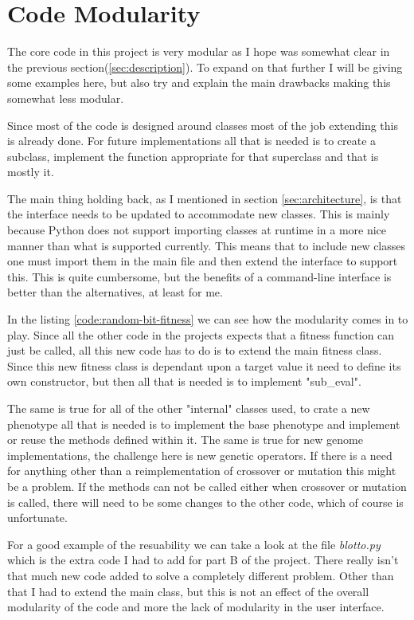 \section{Code Modularity}\label{sec:modularity}
The core code in this project is very modular as I hope was somewhat clear in
the previous section(\ref{sec:description}). To expand on that further I will be
giving some examples here, but also try and explain the main drawbacks making
this somewhat less modular.

Since most of the code is designed around classes most of the job extending this
is already done. For future implementations all that is needed is to create a
subclass, implement the function appropriate for that superclass and that is
mostly it.

The main thing holding back, as I mentioned in section \ref{sec:architecture},
is that the interface needs to be updated to accommodate new classes. This is
mainly because Python does not support importing classes at runtime in a more
nice manner than what is supported currently. This means that to include new
classes one must import them in the main file and then extend the interface to
support this. This is quite cumbersome, but the benefits of a command-line
interface is better than the alternatives, at least for me.

In the listing \ref{code:random-bit-fitness} we can see how the modularity comes
in to play. Since all the other code in the projects expects that a fitness
function can just be called, all this new code has to do is to extend the main
fitness class. Since this new fitness class is dependant upon a target value it
need to define its own constructor, but then all that is needed is to implement
"sub\_eval".



The same is true for all of the other "internal" classes used, to crate a new
phenotype all that is needed is to implement the base phenotype and implement or
reuse the methods defined within it. The same is true for new genome
implementations, the challenge here is new genetic operators. If there is a need
for anything other than a reimplementation of crossover or mutation this might
be a problem. If the methods can not be called either when crossover or mutation
is called, there will need to be some changes to the other code, which of course
is unfortunate.

For a good example of the resuability we can take a look at the file
\textit{blotto.py} which is the extra code I had to add for part B of the
project. There really isn't that much new code added to solve a completely
different problem. Other than that I had to extend the main class, but this is
not an effect of the overall modularity of the code and more the lack of
modularity in the user interface.
